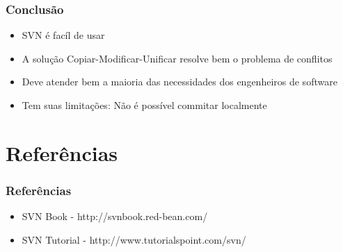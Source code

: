 \documentclass{beamer}
\begin{document}
\begin{frame}
    \frametitle{Conclus\~ao}

    \begin{itemize}
        \item SVN \'e fac\'il de usar
        \item A solu\c{c}\~ao Copiar-Modificar-Unificar resolve bem o problema de conflitos
        \item Deve atender bem a maioria das necessidades dos engenheiros de software
        \item Tem suas limita\c{c}\~oes: N\~ao \'e poss\'ivel commitar localmente
    \end{itemize}
\end{frame}

\section{Refer\^encias}
\begin{frame}
    \frametitle{Refer\^encias}

    \begin{itemize}
        \item SVN Book - http://svnbook.red-bean.com/
        \item SVN Tutorial - http://www.tutorialspoint.com/svn/
    \end{itemize}
\end{frame}
\end{document}
